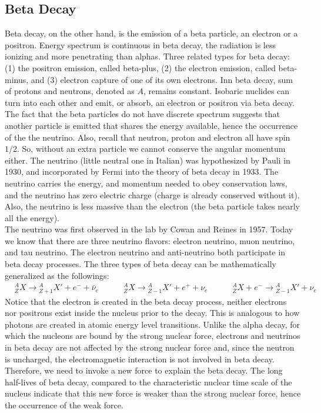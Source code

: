 \documentclass[11pt]{article}
\theoremstyle{break}
\theoremstyle{break}
\begin{document}
\subsection*{Beta Decay}
Beta decay, on the other hand, is the emission of a beta particle, an electron or a positron. Energy spectrum is continuous in beta decay, the radiation is less ionizing and more penetrating than alphas. Three related types for beta decay: (1) the positron emission, called beta-plus, (2) the electron emission, called beta-minus, and (3) electron capture of one of its own electrons. Inn beta decay, sum of protons and neutrons, denoted as $A$, remains constant. Isobaric nuclides can turn into each other and emit, or absorb, an electron or positron via beta decay.\\

The fact that the beta particles do not have discrete spectrum suggests that another particle is emitted that shares the energy available, hence the occurrence of the the neutrino. Also, recall that neutron, proton and electron all have spin $1/2$. So, without an extra particle we cannot conserve the angular momentum either. The neutrino (little neutral one in Italian) was hypothesized by Pauli in 1930, and incorporated by Fermi into the theory of beta decay in 1933. The neutrino carries the energy, and momentum needed to obey conservation laws, and the neutrino has zero electric charge (charge is already conserved without it). Also, the neutrino is less massive than the electron (the beta particle takes nearly all the energy).\\

The neutrino was first observed in the lab by Cowan and Reines in 1957. Today we know that there are three neutrino flavors: electron neutrino, muon neutrino, and tau neutrino. The electron neutrino and anti-neutrino both participate in beta decay processes. The three types of beta decay can be mathematically generalized as the followings:
\begin{align*}
&_Z^AX \to {}_{Z+1}^AX' + e^- + \bar{\nu}_e \qquad\quad _Z^AX \to {}_{Z-1}^AX' + e^+ + \nu_e \quad\qquad _Z^AX+e^- \to {}_{Z-1}^A X' + \nu_e
\end{align*}
Notice that the electron is created in the beta decay process, neither electrons nor positrons exist inside the nucleus 
prior to the decay. This is analogous to how photons are created in atomic energy level transitions. Unlike the alpha decay, for which the nucleons are bound by the strong nuclear force, electrons and neutrinos in beta decay are not affected by the strong nuclear force and, since the neutron is uncharged, the electromagnetic interaction is not involved in beta decay. Therefore, we need to invoke a new force to explain the beta decay. The long half-lives of beta decay, compared to the characteristic nuclear time scale of the nucleus indicate that this new force is weaker than the strong nuclear force, hence the occurrence of the weak force.\\
\end{document}

